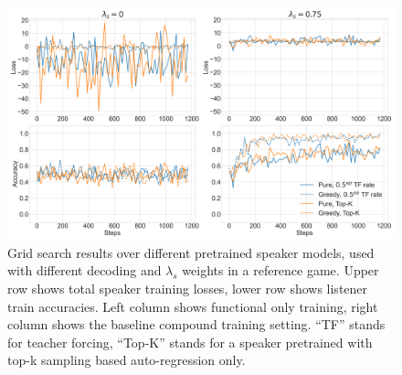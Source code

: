 \begin{figure}
	\centering
	\includegraphics[width=\linewidth]{images/grid_search_pretraining_Ls_decoding.png}
	\caption{Grid search results over different pretrained speaker models, used with different decoding and $\lambda_s$ weights in a reference game. Upper row shows total speaker training losses, lower row shows listener train accuracies. Left column shows functional only training, right column shows the baseline compound training setting. ``TF'' stands for teacher forcing, ``Top-K'' stands for a speaker pretrained with top-k sampling based auto-regression only.}
	\label{fig:coco_grid_pretraining_decoding}
\end{figure}

